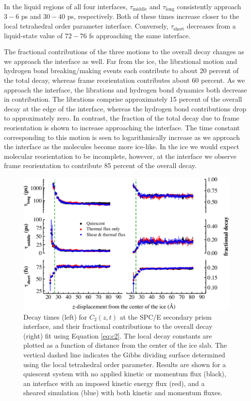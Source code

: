 In the liquid regions of all four interfaces, $\tau_\mathrm{middle}$
and $\tau_\mathrm{long}$ consistently approach $3-6$ ps and $30-40$
ps, respectively.  Both of these times increase closer to the local
tetrahedral order parameter interface.  Conversely,
$\tau_\mathrm{short}$ decreases from a liquid-state value of $72-76$
fs approaching the same interface.

The fractional contributions of the three motions to the overall decay
changes as we approach the interface as well. Far from the ice, the
librational motion and hydrogen bond breaking/making events each
contribute to about 20 percent of the total decay, whereas frame
reorientation contributes about 60 percent. As we approach the
interface, the librations and hydrogen bond dynamics both decrease in
contribution. The librations comprise approximately 15 percent of the
overall decay at the edge of the interface, whereas the hydrogen bond
contributions drop to approximately zero. In contrast, the fraction of
the total decay due to frame reorientation is shown to increase
approaching the interface.  The time constant corresponding to this
motion is seen to logarithmically increase as we approach the interface
as the molecules become more ice-like. In the ice we would expect
molecular reorientation to be incomplete, however, at the interface we
observe frame reorientation to contribute 85 percent of the overall
decay.


\begin{figure}
\includegraphics[width=\linewidth]{Figures/Sec_lcorrz}
\caption{\label{fig:SPorient} Decay times (left) for $C_2(z,t)$ at the
  SPC/E secondary prism interface, and their fractional contributions to the
  overall decay (right) fit using Equation \eqref{eq:c2}. The local decay
  constants are plotted as a function of distance from the center of
  the ice slab. The vertical dashed line indicates the Gibbs dividing
  surface determined using the local tetrahedral order parameter.
  Results are shown for a quiescent system with no applied kinetic or
  momentum flux (black), an interface with an imposed
  kinetic energy flux (red), and a sheared simulation (blue) with both
  kinetic and momentum fluxes.}
\end{figure}

